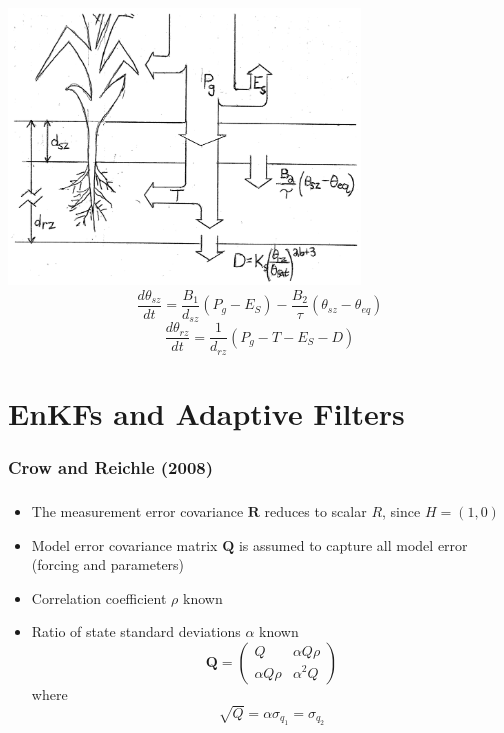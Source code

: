 \documentclass[mathserif]{beamer}
\begin{document}
\begin{frame}
\begin{center}
   \frametitle{\insertsection}
  \includegraphics[width=0.7\textwidth]{websvat}
\[
        \frac{d\theta_{sz}}{dt}=\frac{B_1}{d_{sz}}\left(P_g - E_S\right)-\frac{B_2}{\tau}\left(\theta_{sz}-\theta_{eq}\right)
      \]
      \[
        \frac{d\theta_{rz}}{dt}=\frac{1}{d_{rz}}\left(P_g - T - E_S - D\right)
      \]
\end{center}
\end{frame}

\section{EnKFs and Adaptive Filters}

\begin{frame}
  \frametitle{Crow and Reichle (2008)}
  \tableofcontents[currentsection]
\end{frame}

\begin{frame}
  \frametitle{\insertsection}
  \begin{itemize}
    \item The measurement error covariance $\mathbf{R}$ reduces to scalar $R$, since $H = (1, 0)$
    \item Model error covariance matrix $\mathbf{Q}$ is assumed to capture all model error (forcing and parameters)
    \item Correlation coefficient $\rho$ known
    \item Ratio of state standard deviations $\alpha$ known
      \begin{equation}
        \mathbf{Q}=\begin{pmatrix}
          Q & \alpha Q \rho \\
          \alpha Q \rho & \alpha^2 Q
        \end{pmatrix}
      \end{equation}
      where
      \begin{equation}
        \sqrt{Q} = \alpha\sigma_{q_1} = \sigma_{q_2}
      \end{equation}
  \end{itemize}
\end{frame}
\end{document}

